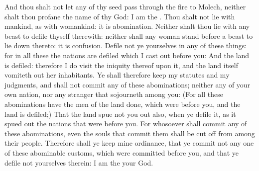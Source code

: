 \begin{biblechapter}
\verse And thou shalt not let any of thy seed pass through the fire to Molech, neither shalt thou profane the name of thy God: I am the \LORD.
\verse Thou shalt not lie with mankind, as with womankind: it is abomination.
\verse Neither shalt thou lie with any beast to defile thyself therewith: neither shall any woman stand before a beast to lie down thereto: it is confusion.
\verse Defile not ye yourselves in any of these things: for in all these the nations are defiled which I cast out before you:
\verse And the land is defiled: therefore I do visit the iniquity thereof upon it, and the land itself vomiteth out her inhabitants.
\verse Ye shall therefore keep my statutes and my judgments, and shall not commit any of these abominations; neither any of your own nation, nor any stranger that sojourneth among you:
\verse (For all these abominations have the men of the land done, which were before you, and the land is defiled;)
\verse That the land spue not you out also, when ye defile it, as it spued out the nations that were before you.
\verse For whosoever shall commit any of these abominations, even the souls that commit them shall be cut off from among their people.
\verse Therefore shall ye keep mine ordinance, that ye commit not any one of these abominable customs, which were committed before you, and that ye defile not yourselves therein: I am the \LORD your God.
\end{biblechapter}

